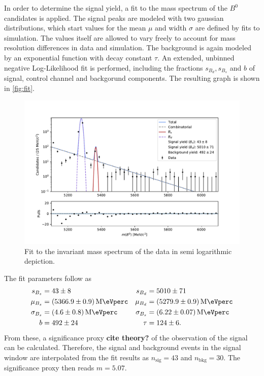 In order to determine the signal yield, a fit to the mass spectrum of the $B^0$ candidates is applied. 
The signal peaks are modeled with two gaussian distributions, which start values for the mean $\mu$ and width $\sigma$ are defined by fits to simulation. The values itself 
are allowed to vary freely to account for mass resolution differences in data and simulation. 
The background is again modeled by an exponential function with decay constant $\tau$.
An extended, unbinned negative Log-Likelihood fit is performed, including the fractions $s_{B_d}, s_{B_s}$ and $b$ of signal, control channel and backgorund components.
The resulting graph is shown in \autoref{fig:fit}.
\begin{figure}
  \centering
  \includegraphics[width = .9\textwidth]{"content/plots/final_fit.pdf"}
  \caption{Fit to the invariant mass spectrum of the data in semi logarithmic depiction.}
  \label{fig:fit}
\end{figure}
The fit parameters follow as 
\begin{align*}
  s_{B_s} &= \num{43 +- 8} & s_{B_d} &= \num{5010 +- 71} \\
  \mu_{B_s} &= \qty{5366.9 +- 0.9}{\mega\eVperc} & \mu_{B_d} &= \qty{5279.9 +- 0.9}{\mega\eVperc} \\
  \sigma_{B_s} &=  \qty{4.6 +- 0.8}{\mega\eVperc} & \sigma_{B_s} &=  \qty{6.22 +- 0.07}{\mega\eVperc} \\
  b &= \num{492 +- 24}  & \tau &= \num{124 +- 6}.
\end{align*}
From these, a significance proxy \textbf{cite theory?} of the observation of the signal can be calculated.
Therefore, the signal and background events in the signal window are interpolated from the fit results as $n_\text{sig} = \num{43}$ and $n_\text{bkg} = \num{30}$.
The significance proxy then reads $m = \num{5.07}$.
